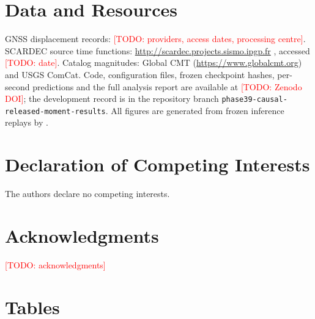 \documentclass[12pt,letterpaper]{article}
\newcommand{\todo}[1]{\textcolor{red}{[TODO: #1]}}
\begin{document}
\section*{Data and Resources}

GNSS displacement records: \todo{providers, access dates, processing centre}. SCARDEC source time functions: \url{http://scardec.projects.sismo.ipgp.fr} \citep{Vallee2016}, accessed \todo{date}. Catalog magnitudes: Global CMT (\url{https://www.globalcmt.org}) and USGS ComCat. Code, configuration files, frozen checkpoint hashes, per-second predictions and the full analysis report are available at \todo{Zenodo DOI}; the development record is in the repository branch \texttt{phase39-causal-released-moment-results}. All figures are generated from frozen inference replays by .

\section*{Declaration of Competing Interests}

The authors declare no competing interests.

\section*{Acknowledgments}

\todo{acknowledgments}




\clearpage
\section*{Tables}

\begin{table}[h]
\centering
\caption{Validation objective metrics and pre-registered gates (6 events, 446 records). FINAL: final-magnitude prefix target; NEW-1: released-moment target; NEW-2: NEW-1 + monotone pair penalty; NEW-3: NEW-1 + scaling interval $[-1.0,0.5]$ (final candidate). Bold marks the pre-registered gates NEW-3 passes.}
\label{tab:validation}
\end{table}
\end{document}
